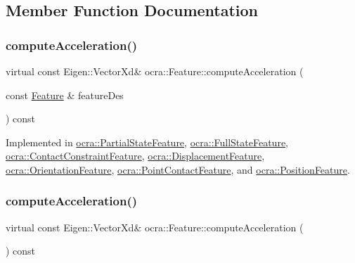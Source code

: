 \subsection{Member Function Documentation}
\hypertarget{classocra_1_1Feature_a4a5973d27459d2dececec8dc73038df8}{}\label{classocra_1_1Feature_a4a5973d27459d2dececec8dc73038df8} 
\subsubsection{\texorpdfstring{compute\+Acceleration()}{computeAcceleration()}\hspace{0.1cm}{\footnotesize\ttfamily [1/2]}}
{\footnotesize\ttfamily virtual const Eigen\+::\+Vector\+Xd\& ocra\+::\+Feature\+::compute\+Acceleration (\begin{DoxyParamCaption}\item[{const \hyperlink{classocra_1_1Feature}{Feature} \&}]{feature\+Des }\end{DoxyParamCaption}) const\hspace{0.3cm}{\ttfamily [pure virtual]}}



Implemented in \hyperlink{classocra_1_1PartialStateFeature_a42af1ac22fc5d9832e134f507a77bfad}{ocra\+::\+Partial\+State\+Feature}, \hyperlink{classocra_1_1FullStateFeature_a1ca39e66ea07182b46ba7e60477efb17}{ocra\+::\+Full\+State\+Feature}, \hyperlink{classocra_1_1ContactConstraintFeature_a81aeb9d50b198c49d0868ba8321bcfd7}{ocra\+::\+Contact\+Constraint\+Feature}, \hyperlink{classocra_1_1DisplacementFeature_a622cd1b7305b26fbbb2f78784fd0ebf0}{ocra\+::\+Displacement\+Feature}, \hyperlink{classocra_1_1OrientationFeature_af5ccb1a3d72b23bc0498c357303fe0e2}{ocra\+::\+Orientation\+Feature}, \hyperlink{classocra_1_1PointContactFeature_ab8f6f7f395e2dc59d74c0676206b12bb}{ocra\+::\+Point\+Contact\+Feature}, and \hyperlink{classocra_1_1PositionFeature_aeff255bf903c24bd898b3d0e4fd9a14c}{ocra\+::\+Position\+Feature}.

\hypertarget{classocra_1_1Feature_aa42b61d4255116caa92042d01ca36b79}{}\label{classocra_1_1Feature_aa42b61d4255116caa92042d01ca36b79} 
\subsubsection{\texorpdfstring{compute\+Acceleration()}{computeAcceleration()}\hspace{0.1cm}{\footnotesize\ttfamily [2/2]}}
{\footnotesize\ttfamily virtual const Eigen\+::\+Vector\+Xd\& ocra\+::\+Feature\+::compute\+Acceleration (\begin{DoxyParamCaption}{ }\end{DoxyParamCaption}) const\hspace{0.3cm}{\ttfamily [pure virtual]}}



